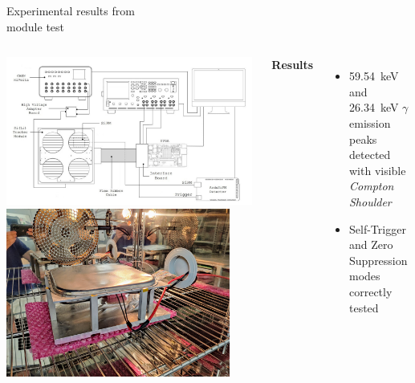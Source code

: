 \documentclass[aspectratio=169,xcolor=dvipsnames]{beamer}
\newcommand{\greencheck}{{\color{ForestGreen}\checkmark}}
\begin{document}
\begin{frame}{Experimental results from\\ \vskip-0.15cm module test}
\begin{columns}
            \begin{columns}
                    \includegraphics[width=0.99\textwidth]{images/muon_detection/test_setup_MODULE.jpg}
                    \includegraphics[width=0.9\textwidth]{images/muon_detection/foto_modulo_camera.jpg}
            \end{columns}

            \fontsize{10pt}{1}\selectfont
            \textbf{Results} \\
            \vspace{0.05cm}

            \fontsize{8.5pt}{1}\selectfont
            \begin{itemize}
                \item \SI{59.54}{\kilo\electronvolt} and \SI{26.34}{\kilo\electronvolt}  $\gamma$ emission peaks detected with visible \textit{Compton Shoulder} \greencheck
                \item Self-Trigger and Zero Suppression modes correctly tested \greencheck
            \end{itemize}


\end{columns}
\end{frame}
\end{document}
